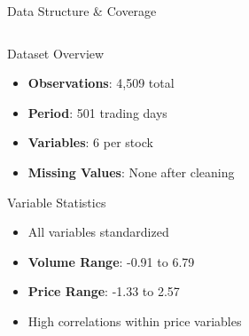 \documentclass{beamer}
\begin{document}
\begin{frame}{Data Structure \& Coverage}
    \begin{columns}
        \begin{column}{0.48\textwidth}
            \begin{block}{Dataset Overview}
                \begin{itemize}
                    \item \textbf{Observations}: 4,509 total
                    \item \textbf{Period}: 501 trading days
                    \item \textbf{Variables}: 6 per stock
                    \item \textbf{Missing Values}: None after cleaning
                \end{itemize}
            \end{block}

            \begin{block}{Variable Statistics}
                \begin{itemize}\setlength{\itemsep}{0pt}
                    \item All variables standardized
                    \item \textbf{Volume Range}: -0.91 to 6.79
                    \item \textbf{Price Range}: -1.33 to 2.57
                    \item High correlations within price variables
                \end{itemize}
            \end{block}
        \end{column}


\end{columns}
\end{frame}
\end{document}
